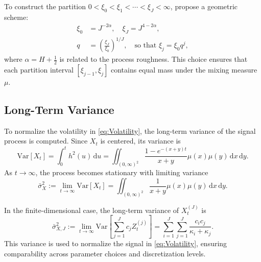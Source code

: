 To construct the partition $0 < \xi_0 < \xi_1 < \cdots < \xi_J < \infty$, \citet{DamianFrey2024} propose a geometric scheme:
\begin{align}
    \xi_0 &= J^{-2\alpha}, \quad \xi_J = J^{4 - 2\alpha}, \\
    q &= \left( \frac{\xi_J}{\xi_0} \right)^{1/J}, \quad \text{so that } \xi_j = \xi_0 q^j,
\end{align}
where $\alpha = H + \tfrac{1}{2}$ is related to the process roughness. This choice ensures that each partition interval $[\xi_{j-1}, \xi_j]$ contains equal mass under the mixing measure $\mu$.


\subsection{Long-Term Variance} \label{subsec:LongTermVariance}

To normalize the volatility in \eqref{eq:Volatility}, the long-term variance of the signal process is computed. Since $X_t$ is centered, its variance is
\begin{equation} \label{eq:SignalVariance}
    \mathrm{Var}[X_t] = \int_0^t h^2(u) \,\mathrm{d}u = \iint_{(0,\infty)^2} \frac{1 - e^{-(x+y)t}}{x + y} \mu(x)\mu(y) \,\mathrm{d}x \,\mathrm{d}y.
\end{equation}
As $t \to \infty$, the process becomes stationary with limiting variance
\begin{equation}
    \bar{\sigma}_X^2 := \lim_{t \to \infty} \mathrm{Var}[X_t] = \iint_{(0,\infty)^2} \frac{1}{x + y} \mu(x)\mu(y) \,\mathrm{d}x \,\mathrm{d}y.
\end{equation}

In the finite-dimensional case, the long-term variance of $X_t^{(J)}$ is
\begin{equation}
    \bar{\sigma}_{X,J}^2 := \lim_{t \to \infty} \mathrm{Var} \left[ \sum_{j=1}^J c_j Z_t^{(j)} \right] = \sum_{i=1}^J \sum_{j=1}^J \frac{c_i c_j}{\kappa_i + \kappa_j}.
\end{equation}
This variance is used to normalize the signal in \eqref{eq:Volatility}, ensuring comparability across parameter choices and discretization levels.